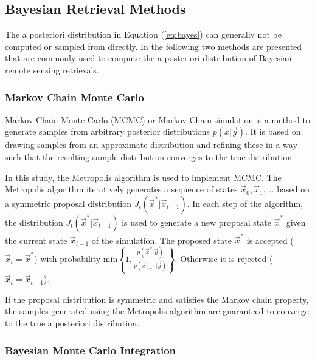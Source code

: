 \documentclass[journal abbreviation, manuscript]{copernicus}
\begin{document}
\subsection{Bayesian Retrieval Methods}

The a posteriori distribution in Equation (\ref{eq:bayes}) can generally not
be computed or sampled from directly. In the following two methods are presented
that are commonly used to compute the a posteriori distribution of Bayesian remote
sensing retrievals.

\subsubsection{Markov Chain Monte Carlo}

    Markov Chain Monte Carlo (MCMC) or Markov Chain simulation is a method
    to generate samples from arbitrary posterior distributions $p(x | \vec{y})$.
    It is based on drawing samples from an approximate distribution and
    refining these in a way such that the resulting sample distribution
    converges to the true distribution \citep{bda}.

    In this study, the Metropolis algorithm is used to implement MCMC. The
    Metropolis algorithm iteratively generates a sequence of states $\vec{x}_0,
    \vec{x}_1, \ldots$ based on a symmetric proposal distribution
    $J_t(\vec{x}^* | \vec{x}_{t-1})$. In each step of the algorithm, the
    distribution $J_t(\vec{x}^* | \vec{x}_{t-1})$ is used to generate a new
    proposal state $\vec{x}^*$ given the current state $\vec{x}_{t-1}$ of the simulation.
    The proposed state $\vec{x}^*$ is accepted ($\vec{x}_t = \vec{x}^*$) with
    probability $\text{min} \left \{1, \frac{p(\vec{x}^x |
      \vec{y})}{p(\vec{x}_{t-1} | \vec{y})} \right \}$. Otherwise it is rejected
    ($\vec{x}_t = \vec{x}_{t-1}$).

    If the proposal distribution is symmetric and satisfies the Markov chain property, the
    samples generated using the Metropolis algorithm are guaranteed to converge to the
    true a posteriori distribution. 

\subsubsection{Bayesian Monte Carlo Integration}
\end{document}

